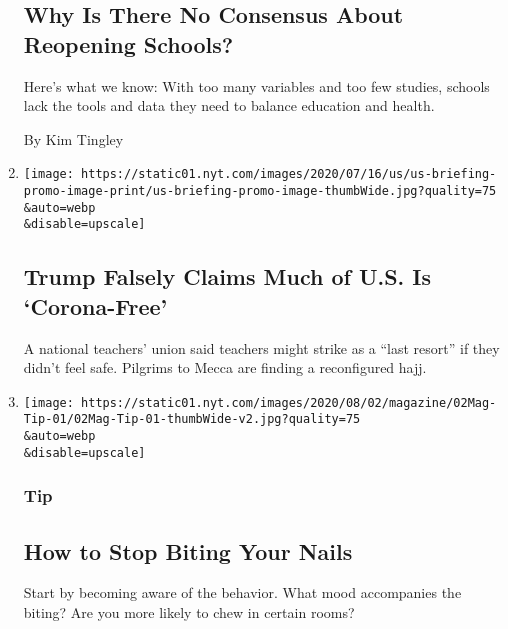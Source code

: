 \begin{enumerate}
  \hypertarget{why-is-there-no-consensus-about-reopening-schools}{%
  \subsection{Why Is There No Consensus About Reopening
  Schools?}\label{why-is-there-no-consensus-about-reopening-schools}}

  Here's what we know: With too many variables and too few studies,
  schools lack the tools and data they need to balance education and
  health.

  By Kim Tingley
\item
  \href{/2020/07/28/world/coronavirus-covid-19.html}{}

  \texttt{[image: https://static01.nyt.com/images/2020/07/16/us/us-briefing-promo-image-print/us-briefing-promo-image-thumbWide.jpg?quality=75\\\&auto=webp\\\&disable=upscale]}

  \hypertarget{trump-falsely-claims-much-of-us-is-corona-free}{%
  \subsection{Trump Falsely Claims Much of U.S. Is
  `Corona-Free'}\label{trump-falsely-claims-much-of-us-is-corona-free}}

  A national teachers' union said teachers might strike as a ``last
  resort'' if they didn't feel safe. Pilgrims to Mecca are finding a
  reconfigured hajj.
\item
  \href{/2020/07/28/magazine/how-to-stop-biting-your-nails.html}{}

  \texttt{[image: https://static01.nyt.com/images/2020/08/02/magazine/02Mag-Tip-01/02Mag-Tip-01-thumbWide-v2.jpg?quality=75\\\&auto=webp\\\&disable=upscale]}

  \hypertarget{tip-}{%
  \subsubsection{Tip }\label{tip-}}

  \hypertarget{how-to-stop-biting-your-nails}{%
  \subsection{How to Stop Biting Your
  Nails}\label{how-to-stop-biting-your-nails}}

  Start by becoming aware of the behavior. What mood accompanies the
  biting? Are you more likely to chew in certain rooms?


\end{enumerate}
